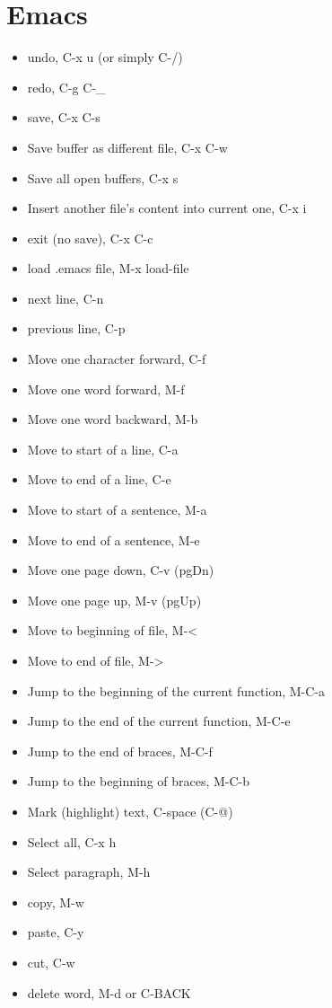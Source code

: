 \documentclass[11pt]{article}
\begin{document}
\section{Emacs}
\label{sec:orgca109b3}
\begin{itemize}
\item undo, C-x u (or simply C-/)
\item redo, C-g C-\_
\item save, C-x C-s
\item Save buffer as different file, C-x C-w
\item Save all open buffers, C-x s
\item Insert another file's content into current one, C-x i
\item exit (no save), C-x C-c
\item load .emacs file, M-x load-file
\item next line, C-n
\item previous line, C-p
\item Move one character forward, C-f
\item Move one word forward, M-f
\item Move one word backward, M-b
\item Move to start of a line, C-a
\item Move to end of a line, C-e
\item Move to start of a sentence, M-a
\item Move to end of a sentence, M-e
\item Move one page down, C-v (pgDn)
\item Move one page up, M-v (pgUp)
\item Move to beginning of file, M-<
\item Move to end of file, M->
\item Jump to the beginning of the current function, M-C-a
\item Jump to the end of the current function, M-C-e
\item Jump to the end of braces, M-C-f
\item Jump to the beginning of braces, M-C-b
\item Mark (highlight) text, C-space (C-@)
\item Select all, C-x h
\item Select paragraph, M-h
\item copy, M-w
\item paste, C-y
\item cut, C-w
\item delete word, M-d or C-BACK

\end{itemize}
\end{document}
